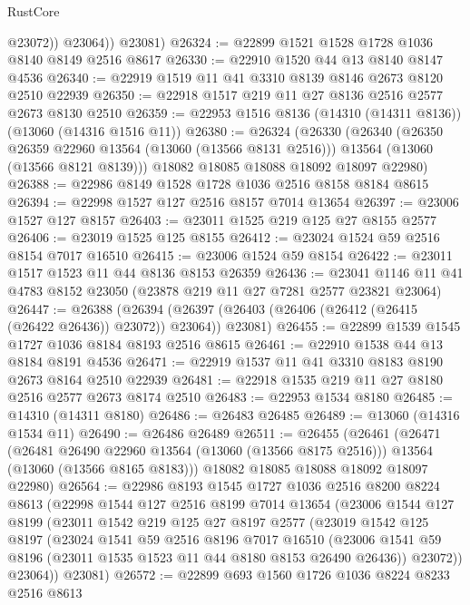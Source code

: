 \begin{lexlean}{RustCore}
\begin{coremodule}
              @23072))
          @23064))
      @23081)
@26324 := @22899 @1521 @1528 @1728 @1036 @8140 @8149 @2516 @8617
@26330 := @22910 @1520 @44 @13 @8140 @8147 @4536
@26340 := @22919 @1519 @11 @41 @3310 @8139 @8146 @2673 @8120 @2510 @22939
@26350 := @22918 @1517 @219 @11 @27 @8136 @2516 @2577 @2673 @8130 @2510
@26359 := @22953 @1516 @8136 (@14310 (@14311 @8136)) (@13060 (@14316 @1516 @11))
@26380 := @26324
    (@26330
      (@26340
        (@26350 @26359 @22960 @13564 (@13060 (@13566 @8131 @2516)))
        @13564
        (@13060 (@13566 @8121 @8139)))
      @18082
      @18085
      @18088
      @18092
      @18097
      @22980)
@26388 := @22986 @8149 @1528 @1728 @1036 @2516 @8158 @8184 @8615
@26394 := @22998 @1527 @127 @2516 @8157 @7014 @13654
@26397 := @23006 @1527 @127 @8157
@26403 := @23011 @1525 @219 @125 @27 @8155 @2577
@26406 := @23019 @1525 @125 @8155
@26412 := @23024 @1524 @59 @2516 @8154 @7017 @16510
@26415 := @23006 @1524 @59 @8154
@26422 := @23011 @1517 @1523 @11 @44 @8136 @8153 @26359
@26436 := @23041 @1146 @11 @41 @4783 @8152 @23050 (@23878 @219 @11 @27 @7281 @2577 @23821 @23064)
@26447 := @26388
    (@26394 (@26397 (@26403 (@26406 (@26412 (@26415 (@26422 @26436)) @23072)) @23064)) @23081)
@26455 := @22899 @1539 @1545 @1727 @1036 @8184 @8193 @2516 @8615
@26461 := @22910 @1538 @44 @13 @8184 @8191 @4536
@26471 := @22919 @1537 @11 @41 @3310 @8183 @8190 @2673 @8164 @2510 @22939
@26481 := @22918 @1535 @219 @11 @27 @8180 @2516 @2577 @2673 @8174 @2510
@26483 := @22953 @1534 @8180
@26485 := @14310 (@14311 @8180)
@26486 := @26483 @26485
@26489 := @13060 (@14316 @1534 @11)
@26490 := @26486 @26489
@26511 := @26455
    (@26461
      (@26471
        (@26481 @26490 @22960 @13564 (@13060 (@13566 @8175 @2516)))
        @13564
        (@13060 (@13566 @8165 @8183)))
      @18082
      @18085
      @18088
      @18092
      @18097
      @22980)
@26564 := @22986
    @8193
    @1545
    @1727
    @1036
    @2516
    @8200
    @8224
    @8613
    (@22998
      @1544
      @127
      @2516
      @8199
      @7014
      @13654
      (@23006
        @1544
        @127
        @8199
        (@23011
          @1542
          @219
          @125
          @27
          @8197
          @2577
          (@23019
            @1542
            @125
            @8197
            (@23024
              @1541
              @59
              @2516
              @8196
              @7017
              @16510
              (@23006 @1541 @59 @8196 (@23011 @1535 @1523 @11 @44 @8180 @8153 @26490 @26436))
              @23072))
          @23064))
      @23081)
@26572 := @22899 @693 @1560 @1726 @1036 @8224 @8233 @2516 @8613

\end{coremodule}
\end{lexlean}
